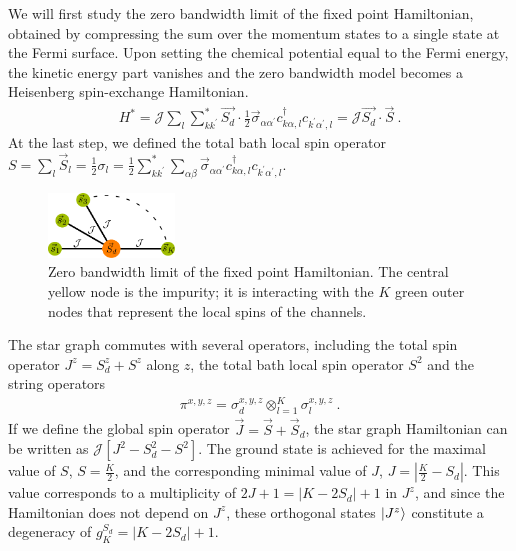 \documentclass[reprint,prb,superscriptaddress]{revtex4-2}
\begin{document}
We will first study the zero bandwidth limit of the fixed point Hamiltonian, obtained by compressing the sum over the momentum states to a single state at the Fermi surface. Upon setting the chemical potential equal to the Fermi energy, the kinetic energy part vanishes and the zero bandwidth model becomes a Heisenberg spin-exchange Hamiltonian.
\begin{equation}\begin{aligned}
	\label{star graph}
	H^* = {\mathcal{J}}\sum_l\sum_{kk^\prime}^* \vec{S_d}\cdot\frac{1}{2}\vec{\sigma}_{\alpha\alpha^\prime}c_{k\alpha,l}^\dagger c_{k^\prime\alpha^\prime, l} = {\mathcal{J}}\vec{S_d}\cdot\vec S~.
\end{aligned}\end{equation}
At the last step, we defined the total bath local spin operator \(S = \sum_l \vec{S}_l = \frac{1}{2}\sigma_l = \frac{1}{2}\sum_{kk^\prime}^*\sum_{\alpha\beta}\vec{\sigma}_{\alpha\alpha^\prime}c_{k\alpha,l}^\dagger c_{k^\prime\alpha^\prime, l}\).
\begin{figure}[htpb]
	\centering
	\includegraphics[width=0.30\textwidth]{plt/stargraph.pdf}
	\caption{Zero bandwidth limit of the fixed point Hamiltonian. The central yellow node is the impurity; it is interacting with the \(K\) green outer nodes that represent the local spins of the channels.}
	\label{fig:star graph}
\end{figure}
The star graph commutes with several operators, including the total spin operator \(J^z = S_d^z + S^z\) along \(z\), the total bath local spin operator \(S^2\) and the string operators 
\begin{equation}\begin{aligned}
\pi^{x,y,z} = \sigma_d^{x,y,z} \otimes_{l=1}^K \sigma_l^{x,y,z}~.
\end{aligned}\end{equation}
If we define the global spin operator \(\vec J = \vec S + \vec S_d\), the star graph Hamiltonian can be written as \(\mathcal{J}\left[J^2 - S_d^2 - S^2\right] \). The ground state is achieved for the maximal value of \(S\), \(S=\frac{K}{2}\), and the corresponding minimal value of \(J\), \(J = |\frac{K}{2} - S_d|\). This value corresponds to a multiplicity of \(2J+1 = |K - 2S_d|+1\) in \(J^z\), and since the Hamiltonian does not depend on \(J^z\), these orthogonal states \(\ket{J^z}\) constitute a degeneracy of \(g^{S_d}_K = |K - 2S_d|+1\).
\end{document}

